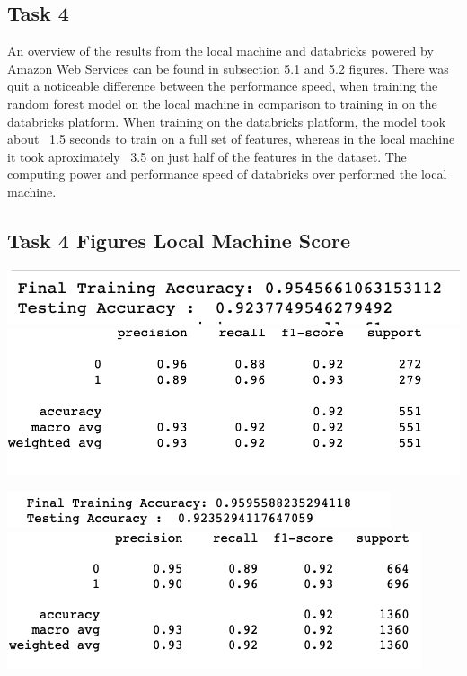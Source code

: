 \documentclass[12pt]{article}
\begin{document}
\begin{multicols*}{2}
  \section{Task 4}

  \hspace*{5mm} An overview of the results from the local machine and databricks powered by Amazon Web Services can be found in subsection 5.1 and 5.2 figures. There was quit a noticeable difference
  between the performance speed, when training the random forest model on the local machine in comparison to training in on the databricks platform. When training on the databricks platform, the model took about 
  ~1.5 seconds to train on a full set of features, whereas in the local machine it took aproximately ~3.5 on just half of the features in the dataset. The computing power and performance speed of databricks 
  over performed the local machine. 


  \subsection{Task 4 Figures Local Machine Score}
  \begin{center}
		\includegraphics[scale=0.4]{../screenshot/Rf-Non-Overlapping01/score.png}
    \includegraphics[scale=0.4]{../screenshot/Rf-Non-Overlapping01/machine_score.png}

		\includegraphics[scale=0.4]{../screenshot/Rf-Overlapping01/score.png}
    \includegraphics[scale=0.4]{../screenshot/Rf-Overlapping01/machine_score.png}


\end{center}
\end{multicols*}
\end{document}
